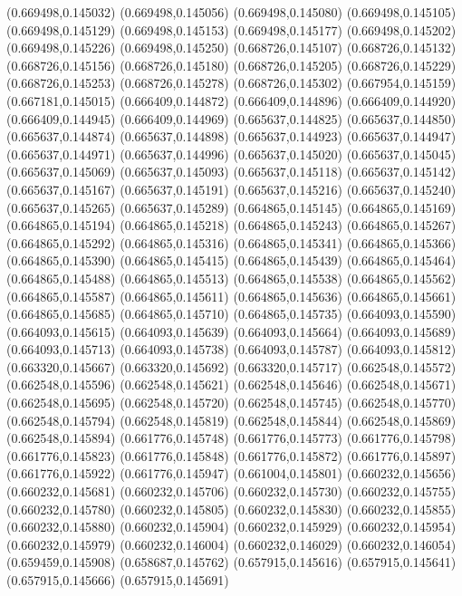 (0.669498,0.145032)
(0.669498,0.145056)
(0.669498,0.145080)
(0.669498,0.145105)
(0.669498,0.145129)
(0.669498,0.145153)
(0.669498,0.145177)
(0.669498,0.145202)
(0.669498,0.145226)
(0.669498,0.145250)
(0.668726,0.145107)
(0.668726,0.145132)
(0.668726,0.145156)
(0.668726,0.145180)
(0.668726,0.145205)
(0.668726,0.145229)
(0.668726,0.145253)
(0.668726,0.145278)
(0.668726,0.145302)
(0.667954,0.145159)
(0.667181,0.145015)
(0.666409,0.144872)
(0.666409,0.144896)
(0.666409,0.144920)
(0.666409,0.144945)
(0.666409,0.144969)
(0.665637,0.144825)
(0.665637,0.144850)
(0.665637,0.144874)
(0.665637,0.144898)
(0.665637,0.144923)
(0.665637,0.144947)
(0.665637,0.144971)
(0.665637,0.144996)
(0.665637,0.145020)
(0.665637,0.145045)
(0.665637,0.145069)
(0.665637,0.145093)
(0.665637,0.145118)
(0.665637,0.145142)
(0.665637,0.145167)
(0.665637,0.145191)
(0.665637,0.145216)
(0.665637,0.145240)
(0.665637,0.145265)
(0.665637,0.145289)
(0.664865,0.145145)
(0.664865,0.145169)
(0.664865,0.145194)
(0.664865,0.145218)
(0.664865,0.145243)
(0.664865,0.145267)
(0.664865,0.145292)
(0.664865,0.145316)
(0.664865,0.145341)
(0.664865,0.145366)
(0.664865,0.145390)
(0.664865,0.145415)
(0.664865,0.145439)
(0.664865,0.145464)
(0.664865,0.145488)
(0.664865,0.145513)
(0.664865,0.145538)
(0.664865,0.145562)
(0.664865,0.145587)
(0.664865,0.145611)
(0.664865,0.145636)
(0.664865,0.145661)
(0.664865,0.145685)
(0.664865,0.145710)
(0.664865,0.145735)
(0.664093,0.145590)
(0.664093,0.145615)
(0.664093,0.145639)
(0.664093,0.145664)
(0.664093,0.145689)
(0.664093,0.145713)
(0.664093,0.145738)
(0.664093,0.145787)
(0.664093,0.145812)
(0.663320,0.145667)
(0.663320,0.145692)
(0.663320,0.145717)
(0.662548,0.145572)
(0.662548,0.145596)
(0.662548,0.145621)
(0.662548,0.145646)
(0.662548,0.145671)
(0.662548,0.145695)
(0.662548,0.145720)
(0.662548,0.145745)
(0.662548,0.145770)
(0.662548,0.145794)
(0.662548,0.145819)
(0.662548,0.145844)
(0.662548,0.145869)
(0.662548,0.145894)
(0.661776,0.145748)
(0.661776,0.145773)
(0.661776,0.145798)
(0.661776,0.145823)
(0.661776,0.145848)
(0.661776,0.145872)
(0.661776,0.145897)
(0.661776,0.145922)
(0.661776,0.145947)
(0.661004,0.145801)
(0.660232,0.145656)
(0.660232,0.145681)
(0.660232,0.145706)
(0.660232,0.145730)
(0.660232,0.145755)
(0.660232,0.145780)
(0.660232,0.145805)
(0.660232,0.145830)
(0.660232,0.145855)
(0.660232,0.145880)
(0.660232,0.145904)
(0.660232,0.145929)
(0.660232,0.145954)
(0.660232,0.145979)
(0.660232,0.146004)
(0.660232,0.146029)
(0.660232,0.146054)
(0.659459,0.145908)
(0.658687,0.145762)
(0.657915,0.145616)
(0.657915,0.145641)
(0.657915,0.145666)
(0.657915,0.145691)
